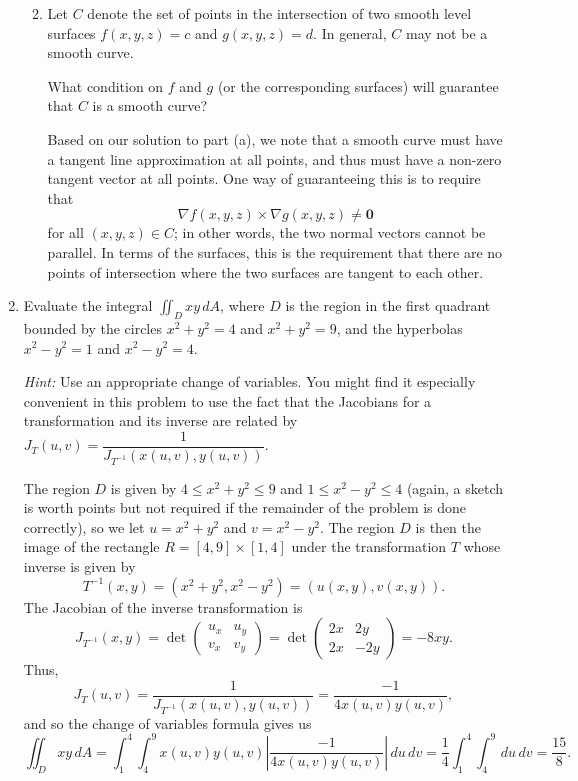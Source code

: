 \documentclass[12pt]{article}
\newcommand{\points}[1]{\marginpar{\hspace{24pt}[#1]}}
\newcommand{\di}{\displaystyle}
\begin{document}
\begin{enumerate}
\begin{enumerate}
\bigskip

\item Let $C$ denote the set of points in the intersection of two smooth level surfaces $f(x,y,z)=c$ and $g(x,y,z)=d$. In general, $C$ may not be a smooth curve. \points{6}

What condition on $f$ and $g$ (or the corresponding surfaces) will guarantee that $C$ is a smooth curve?

\bigskip

Based on our solution to part (a), we note that a smooth curve must have a tangent line approximation at all points, and thus must have a non-zero tangent vector at all points. One way of guaranteeing this is to require that
\[
\nabla f(x,y,z)\times\nabla g(x,y,z)\neq \mathbf{0}
\]
for all $(x,y,z)\in C$; in other words, the two normal vectors cannot be parallel. In terms of the surfaces, this is the requirement that there are no points of intersection where the two surfaces are tangent to each other. 
\end{enumerate}
\newpage

\item Evaluate the integral $\di \iint_D xy\,dA$, where $D$ is the region in the first quadrant bounded by the circles $x^2+y^2=4$ and $x^2+y^2=9$, and the hyperbolas $x^2-y^2=1$ and $x^2-y^2=4$. \points{12}

{\em Hint:} Use an appropriate change of variables. You might find it especially convenient in this problem to use the fact that the Jacobians for a transformation and its inverse are related by $J_T(u,v) = \dfrac{1}{J_{T^{-1}}(x(u,v),y(u,v))}$.

\bigskip

The region $D$ is given by $4\leq x^2+y^2\leq 9$ and $1\leq x^2-y^2\leq 4$ (again, a sketch is worth points but not required if the remainder of the problem is done correctly), so we let $u=x^2+y^2$ and $v=x^2-y^2$. The region $D$ is then the image of the rectangle $R=[4,9]\times [1,4]$ under the transformation $T$ whose inverse is given by
\[
T^{-1}(x,y) = (x^2+y^2,x^2-y^2) = (u(x,y),v(x,y)).
\]
The Jacobian of the inverse transformation is
\[
J_{T^{-1}}(x,y) = \det\begin{pmatrix}
u_x&u_y\\v_x&v_y
\end{pmatrix} = \det\begin{pmatrix}
2x&2y\\2x&-2y
\end{pmatrix}=-8xy.
\]
Thus,
\[
J_T(u,v) = \frac{1}{J_{T^{-1}}(x(u,v),y(u,v))} = \frac{-1}{4x(u,v)y(u,v)},
\]
and so the change of variables formula gives us
\[
\iint_D xy\,dA = \int_1^4\int_4^9 x(u,v)y(u,v)\left|\frac{-1}{4x(u,v)y(u,v)}\right|\,du\,dv = \frac{1}{4}\int_1^4\int_4^9\,du\,dv = \frac{15}{8}.
\]


\end{enumerate}
\end{document}
